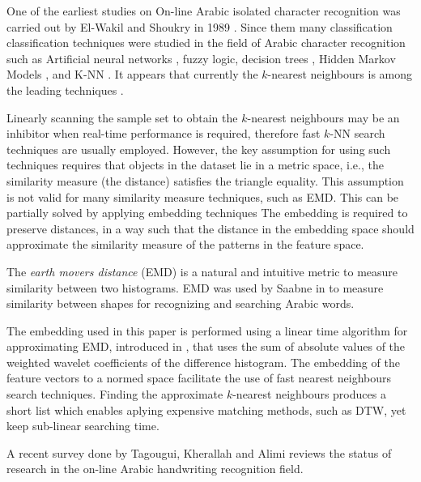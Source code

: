 \documentclass[10pt, conference, compsocconf]{IEEEtran}
\begin{document}
One of the earliest studies on On-line Arabic isolated character recognition was carried out by El-Wakil and Shoukry in 1989 \cite{el1989line}.
Since them many classification classification techniques were studied in the field of Arabic character recognition such as Artificial neural networks \cite{alijla2012oiahcr,ismail2012online}, fuzzy logic, decision trees \cite{ismail2012online}, Hidden Markov Models \cite{biadsy2006online}, and K-NN \cite{elglaly2011isolated}.
It appears that currently the $k$-nearest neighbours is among the leading techniques \cite{elglaly2011isolated}.

Linearly scanning the sample set to obtain the $k$-nearest neighbours may be an inhibitor when real-time performance is required, therefore fast $k$-NN search techniques are usually employed.
However, the key assumption for using such techniques requires that objects in the dataset lie in a metric space, i.e., the similarity measure (the distance) satisfies the triangle equality.
This assumption is not valid for many similarity measure techniques, such as EMD.
This can be partially solved by applying embedding techniques   
The embedding is required to preserve distances, in a way such that the distance in the embedding space should approximate the similarity measure of the patterns in the feature space.

The \emph{earth movers distance} (EMD) is a natural and intuitive metric to measure similarity between two histograms.
EMD was used by Saabne in \cite{saabni2013efficient} to measure similarity between shapes for recognizing and searching Arabic words. 

{The embedding used in this paper is performed using a linear time algorithm for approximating EMD, introduced in \cite{shirdhonkar2008approximate}, that uses the sum of absolute values of the weighted wavelet coefficients of the difference histogram. 
The embedding of the feature vectors to a normed space facilitate the use of fast nearest neighbours search techniques.
Finding the approximate $k$-nearest neighbours produces a short list which enables aplying expensive matching methods, such as DTW, yet keep sub-linear searching time.}

A recent survey done by Tagougui, Kherallah and Alimi \cite{tagougui2013online} reviews the status of research in the on-line Arabic handwriting recognition field. 
\end{document}
